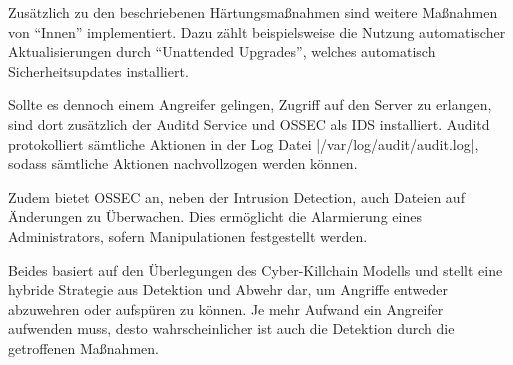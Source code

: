 Zusätzlich zu den beschriebenen Härtungsmaßnahmen sind weitere Maßnahmen von \enquote{Innen} implementiert. Dazu zählt beispielsweise die Nutzung automatischer Aktualisierungen durch \enquote{Unattended Upgrades}, welches automatisch Sicherheitsupdates installiert.

Sollte es dennoch einem Angreifer gelingen, Zugriff auf den Server zu erlangen, sind dort zusätzlich der Auditd Service und OSSEC als \ac{IDS} installiert. Auditd protokolliert sämtliche Aktionen in der Log Datei |/var/log/audit/audit.log|, sodass sämtliche Aktionen nachvollzogen werden können.

Zudem bietet OSSEC an, neben der Intrusion Detection, auch Dateien auf Änderungen zu Überwachen. Dies ermöglicht die Alarmierung eines Administrators, sofern Manipulationen festgestellt werden.


Beides basiert auf den Überlegungen des Cyber-Killchain Modells und stellt eine hybride Strategie aus Detektion und Abwehr dar, um Angriffe entweder abzuwehren oder aufspüren zu können. Je mehr Aufwand ein Angreifer aufwenden muss, desto wahrscheinlicher ist auch die Detektion durch die getroffenen Maßnahmen.

